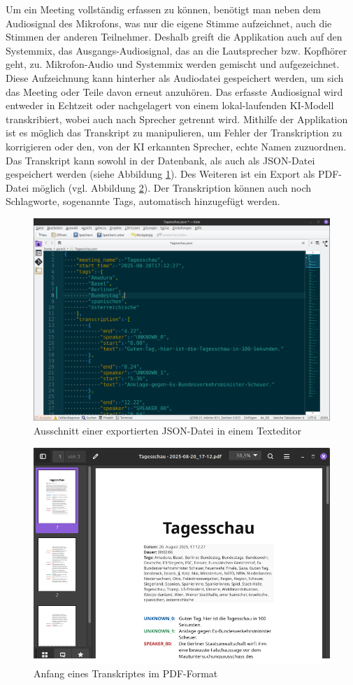 Um ein Meeting vollständig erfassen zu können, benötigt man neben dem Audiosignal des Mikrofons, was nur die eigene Stimme aufzeichnet, auch die Stimmen der anderen Teilnehmer. Deshalb greift die Applikation auch auf den Systemmix, das Ausgangs-Audiosignal, das an die Lautsprecher bzw. Kopfhörer geht, zu. Mikrofon-Audio und Systemmix werden gemischt und aufgezeichnet. Diese Aufzeichnung kann hinterher als Audiodatei gespeichert werden, um sich das Meeting oder Teile davon erneut anzuhören. Das erfasste Audiosignal wird entweder in Echtzeit oder nachgelagert von einem lokal-laufenden \ac{KI}-Modell transkribiert, wobei auch nach Sprecher getrennt wird. Mithilfe der Applikation ist es möglich das Transkript zu manipulieren, um Fehler der Transkription zu korrigieren oder den, von der \ac{KI} erkannten Sprecher, echte Namen zuzuordnen. Das Transkript kann sowohl in der Datenbank, als auch als JSON-Datei gespeichert werden (siehe Abbildung \ref{pic:json}). Des Weiteren ist ein Export als PDF-Datei möglich (vgl. Abbildung \ref{pic:pdf}). Der Transkription können auch noch Schlagworte, sogenannte Tags, automatisch hinzugefügt werden.


\begin{figure}
    \centering
    \includegraphics[width=0.7\linewidth]{Bilder/JSON}
    \caption[JSON]{Ausschnitt einer exportierten JSON-Datei in einem Texteditor}
    \label{pic:json}
\end{figure}


\begin{figure}
    \centering
    \includegraphics[width=0.7\linewidth]{Bilder/PDF}
    \caption[PDF]{Anfang eines Transkriptes im PDF-Format}
    \label{pic:pdf}
\end{figure}





